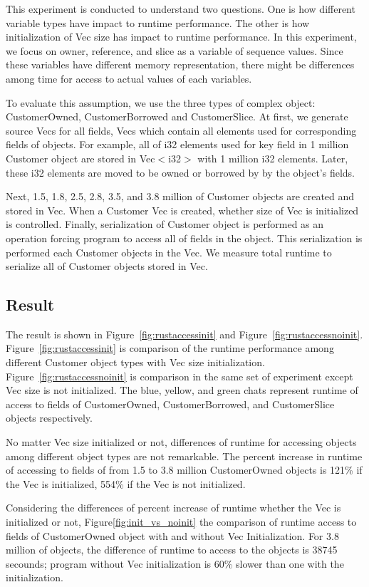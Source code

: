 This experiment is conducted to understand two questions. One is how different variable types have impact to runtime performance.
The other is how initialization of Vec size has impact to runtime performance. 
In this experiment, we focus on owner, reference, and slice as a variable of sequence values. 
Since these variables have different memory representation, there might be differences among time for access to actual values of each variables.

To evaluate this assumption, we use the three types of complex object: CustomerOwned, CustomerBorrowed and CustomerSlice. 
At first, we generate source Vecs for all fields, Vecs which contain all elements used for corresponding fields of objects.
For example, all of i32 elements used for key field in 1 million Customer object are stored in Vec$<$i32$>$ with 1 million i32 elements. 
Later, these i32 elements are moved to be owned or borrowed by by the object's fields.

Next, 1.5, 1.8, 2.5, 2.8, 3.5, and 3.8 million of Customer objects are created and stored in Vec. 
When a Customer Vec is created, whether size of Vec is initialized is controlled. 
Finally, serialization of Customer object is performed as an operation forcing program to access all of fields in the object.
This serialization is performed each Customer objects in the Vec. We measure total runtime to serialize all of Customer objects 
stored in Vec. 

\subsection{Result}
\label{sec:history}
The result is shown in Figure~\ref{fig:rustaccessinit} and Figure~\ref{fig:rustaccessnoinit}.
Figure~\ref{fig:rustaccessinit} is comparison of the runtime performance among different Customer object types with Vec size initialization.
Figure~\ref{fig:rustaccessnoinit} is comparison in the same set of experiment except Vec size is not initialized. 
The blue, yellow, and green chats represent runtime of access to fields of CustomerOwned, CustomerBorrowed, and CustomerSlice objects respectively.

No matter Vec size initialized or not, differences of runtime for accessing objects among different object types are not remarkable. 
The percent increase in runtime of accessing to fields of from 1.5 to 3.8 million CustomerOwned objects is 121\% if the Vec is initialized, 554\% if the Vec is not initialized.

Considering the differences of percent increase of runtime whether the Vec is initialized or not, 
Figure\ref{fig:init_vs_noinit} the comparison of runtime access to fields of CustomerOwned object with and without Vec Initialization.
For 3.8 million of objects, the difference of runtime to access to the objects is 38745 secounds; program without Vec initialization is 60\% slower than one with the initialization.

